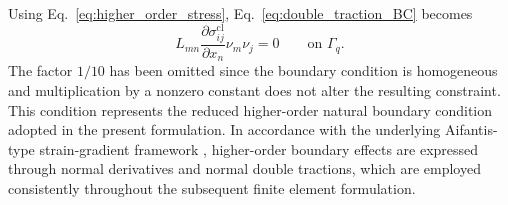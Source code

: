 \documentclass[final,3p,times,fleqn]{elsarticle}
\begin{document}
Using Eq.~\eqref{eq:higher_order_stress}, Eq.~\eqref{eq:double_traction_BC}
becomes
\begin{equation}\label{eq:BC2}
L_{mn}
\frac{\partial\sigma_{ij}^{\mathrm{cl}}}{\partial x_n}
\nu_m\nu_j
=
0
\qquad
\text{on } \Gamma_q .
\end{equation}
The factor $1/10$ has been omitted since the boundary condition is
homogeneous and multiplication by a nonzero constant does not alter the
resulting constraint. This condition represents the reduced higher-order natural boundary
condition adopted in the present formulation. In accordance with the
underlying Aifantis-type strain-gradient framework 
\cite{Aifantis1992,AltanAifantis1997,AskesAifantis2011}, higher-order
boundary effects are expressed through normal derivatives and normal
double tractions, which are employed consistently throughout the
subsequent finite element formulation.
\end{document}
